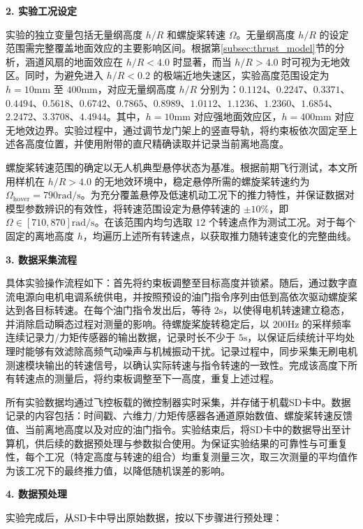 \textbf{2. 实验工况设定}

实验的独立变量包括无量纲高度 $h/R$ 和螺旋桨转速 $\Omega$。无量纲高度 $h/R$ 的设定范围需完整覆盖地面效应的主要影响区间。根据第\ref{subsec:thrust_model}节的分析，涵道风扇的地面效应在 $h/R < 4.0$ 时显著，而当 $h/R > 4.0$ 时可视为无地效区。同时，为避免进入 $h/R < 0.2$ 的极端近地失速区，实验高度范围设定为 $h = 10\mathrm{mm}$ 至 $400\mathrm{mm}$，对应无量纲高度 $h/R$ 分别为：$0.1124$、$0.2247$、$0.3371$、$0.4494$、$0.5618$、$0.6742$、$0.7865$、$0.8989$、$1.0112$、$1.1236$、$1.2360$、$1.6854$、$2.2472$、$3.3708$、$4.4944$。其中，$h = 10\mathrm{mm}$ 对应强地面效应区，$h = 400\mathrm{mm}$ 对应无地效边界。实验过程中，通过调节龙门架上的竖直导轨，将约束板依次固定至上述各高度位置，并使用附带的直尺精确读取并记录当前离地高度。

螺旋桨转速范围的确定以无人机典型悬停状态为基准。根据前期飞行测试，本文所用样机在 $h/R > 4.0$ 的无地效环境中，稳定悬停所需的螺旋桨转速约为 $\Omega_{\mathrm{hover}} = 790\mathrm{rad/s}$。为充分覆盖悬停及低速机动工况下的推力特性，并保证数据对模型参数辨识的有效性，将转速范围设定为悬停转速的 $\pm 10\%$，即 $\Omega \in [710,870]\mathrm{rad/s}$。在该范围内均匀选取 $12$ 个转速点作为测试工况。对于每个固定的离地高度 $h$，均遍历上述所有转速点，以获取推力随转速变化的完整曲线。

\textbf{3. 数据采集流程}

具体实验操作流程如下：首先将约束板调整至目标高度并锁紧。随后，通过数字直流电源向电机电调系统供电，并按照预设的油门指令序列由低到高依次驱动螺旋桨达到各目标转速。在每个油门指令发出后，等待 $2\mathrm{s}$，以使得电机转速建立稳态，并消除启动瞬态过程对测量的影响。待螺旋桨旋转稳定后，以 $200\mathrm{Hz}$ 的采样频率连续记录力/力矩传感器的输出数据，记录时长不少于 $5\mathrm{s}$，以保证后续统计平均处理时能够有效滤除高频气动噪声与机械振动干扰。记录过程中，同步采集无刷电机测速模块输出的转速信号，以确认实际转速与指令转速的一致性。完成该高度下所有转速点的测量后，将约束板调整至下一高度，重复上述过程。

所有实验数据均通过飞控板载的微控制器实时采集，并存储于机载SD卡中。数据记录的内容包括：时间戳、六维力/力矩传感器各通道原始数值、螺旋桨转速反馈值、当前离地高度以及对应的油门指令。实验结束后，将SD卡中的数据导出至计算机，供后续的数据预处理与参数拟合使用。为保证实验结果的可靠性与可重复性，每个工况（特定高度与转速的组合）均重复测量三次，取三次测量的平均值作为该工况下的最终推力值，以降低随机误差的影响。

\textbf{4. 数据预处理}

实验完成后，从SD卡中导出原始数据，按以下步骤进行预处理：

